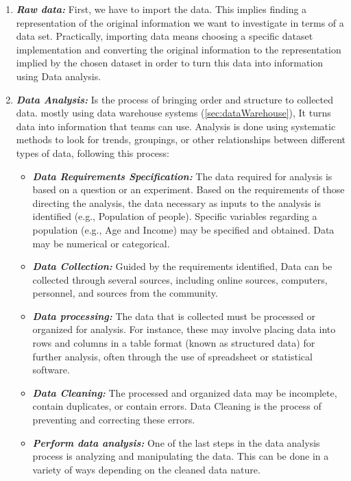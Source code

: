  
\begin{enumerate}
  \item \textbf{\textit{Raw data:}} First, we have to import the data. This implies finding a representation of the original information we want to investigate in terms of a data set. Practically, importing data means choosing a specific dataset implementation and converting the original information to the representation implied by the chosen dataset in order to turn this data into information using Data analysis.
  \item \textbf{\textit{Data Analysis:}} Is the process of bringing order and structure to collected data. mostly using data warehouse systems (\ref{sec:dataWarehouse}), It turns data into information  that teams can use. Analysis is done using systematic methods to look for trends, groupings, or other relationships between different types of data\cite{DataAnalysisVisualization}, following this process:
  \begin{itemize}
  \item \textbf{\textit{Data Requirements Specification:}} The data required for analysis is based on a question or an experiment. Based on the requirements of those directing the analysis, the data necessary as inputs to the analysis is identified (e.g., Population of people). Specific variables regarding a population (e.g., Age and Income) may be specified and obtained. Data may be numerical or categorical\cite{DataAnalysisProcess}.
  \item \textbf{\textit{Data Collection:}} Guided by the requirements identified, Data can be collected through several sources, including online sources, computers, personnel, and sources from the community.
  \item \textbf{\textit{Data processing:}} The data that is collected must be processed or organized for analysis. For instance, these may involve placing data into rows and columns in a table format (known as structured data) for further analysis, often through the use of spreadsheet or statistical software\cite{DataAnalysis2022}.
  \item \textbf{\textit{Data Cleaning:}} The processed and organized data may be incomplete, contain duplicates, or contain errors. Data Cleaning is the process of preventing and correcting these errors\cite{DataAnalysisProcess}. 
  \item \textbf{\textit{Perform data analysis:}}  One of the last steps in the data analysis process is analyzing and manipulating the data. This can be done in a variety of ways depending on the cleaned data nature\cite{WhatDataAnalysis}.

\end{itemize}
\end{enumerate}
